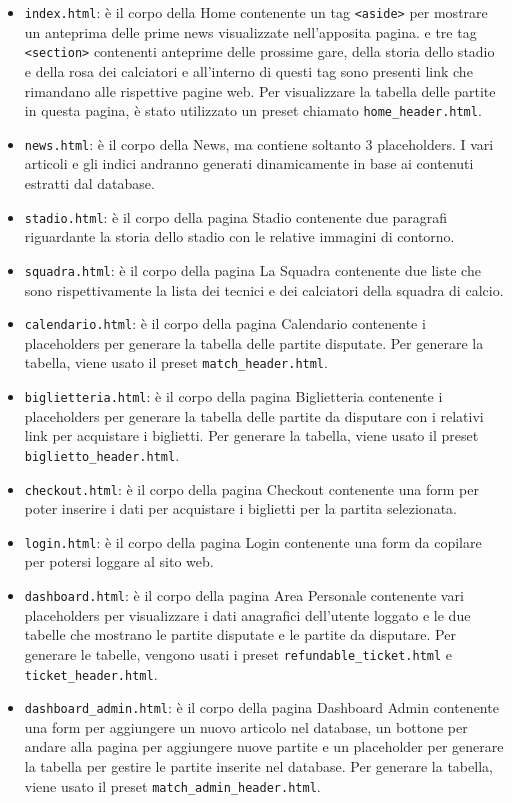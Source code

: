 \documentclass[12pt, a4paper]{article}
\begin{document}
\begin{itemize}
	\item \texttt{index.html}: è il corpo della Home contenente un tag \texttt{<aside>} per mostrare un anteprima delle prime news visualizzate nell'apposita pagina.
	e tre tag \texttt{<section>} contenenti anteprime delle prossime gare, della storia dello stadio e della rosa dei calciatori e all'interno di questi tag sono presenti link che rimandano alle rispettive pagine web.
	Per visualizzare la tabella delle partite in questa pagina, è stato utilizzato un preset chiamato \texttt{home\_header.html}.
	\item \texttt{news.html}: è il corpo della News, ma contiene soltanto 3 placeholders. I vari articoli e gli indici andranno generati dinamicamente in base ai contenuti estratti dal database.
	\item \texttt{stadio.html}: è il corpo della pagina Stadio contenente due paragrafi riguardante la storia dello stadio con le relative immagini di contorno.
	\item \texttt{squadra.html}: è il corpo della pagina La Squadra contenente due liste che sono rispettivamente la lista dei tecnici e dei calciatori della squadra di calcio.
	\item \texttt{calendario.html}: è il corpo della pagina Calendario contenente i placeholders per generare la tabella delle partite disputate. Per generare la tabella, viene usato il preset \texttt{match\_header.html}.
	\item \texttt{biglietteria.html}: è il corpo della pagina Biglietteria contenente i placeholders per generare la tabella delle partite da disputare con i relativi link per acquistare i biglietti. Per generare la tabella, viene usato il preset \texttt{biglietto\_header.html}.
	\item \texttt{checkout.html}: è il corpo della pagina Checkout contenente una form per poter inserire i dati per acquistare i biglietti per la partita selezionata.
	\item \texttt{login.html}: è il corpo della pagina Login contenente una form da copilare per potersi loggare al sito web.
	\item \texttt{dashboard.html}: è il corpo della pagina Area Personale contenente vari placeholders per visualizzare i dati anagrafici dell'utente loggato e le due tabelle che mostrano le partite disputate e le partite da disputare. Per generare le tabelle, vengono usati i preset \texttt{refundable\_ticket.html} e \texttt{ticket\_header.html}.
	\item \texttt{dashboard\_admin.html}: è il corpo della pagina Dashboard Admin contenente una form per aggiungere un nuovo articolo nel database, un bottone per andare alla pagina per aggiungere nuove partite e un placeholder per generare la tabella per gestire le partite inserite nel database. Per generare la tabella, viene usato il preset \texttt{match\_admin\_header.html}.

\end{itemize}
\end{document}
